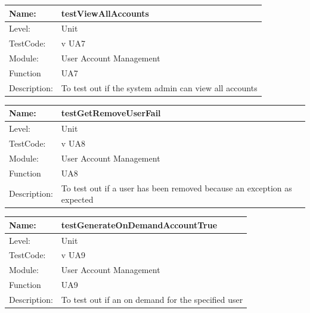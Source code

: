 \documentclass[12pt]{article}
\begin{document}
\begin{flushleft}
\begin{center}
\begin{tabular}{|l|p{12cm}|}
\end{tabular}
\end{center}

\begin{center}
\begin{tabular}{|l|p{12cm}|}
\hline

 Name: & testViewAllAccounts \\
\hline
Level: & Unit \\
\hline
TestCode: & v UA7 \\
\hline
Module:& User Account Management\\
\hline
Function & UA7 \\
\hline
Description: & To test out if the system admin can view all accounts \\
\hline

\end{tabular}
\end{center}

\begin{center}
\begin{tabular}{|l|p{12cm}|}
\hline

 Name: & testGetRemoveUserFail \\
\hline
Level: & Unit \\
\hline
TestCode: & v UA8 \\
\hline
Module:& User Account Management\\
\hline
Function & UA8 \\
\hline
Description: & To test out if a user has been removed because an exception as expected \\
\hline

\end{tabular}
\end{center}

\begin{center}
\begin{tabular}{|l|p{12cm}|}
\hline

 Name: & testGenerateOnDemandAccountTrue\\
\hline
Level: & Unit \\
\hline
TestCode: & v UA9 \\
\hline
Module:& User Account Management\\
\hline
Function & UA9 \\
\hline
Description: & To test out if an on demand for the specified user \\
\hline


\end{tabular}
\end{center}
\end{flushleft}
\end{document}
